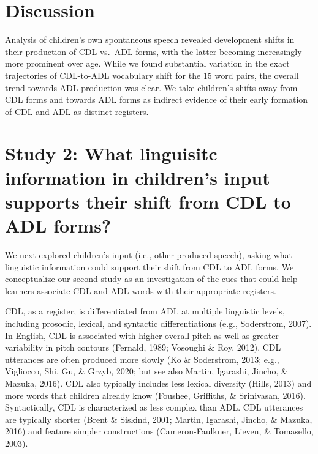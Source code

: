 \documentclass[10pt, letterpaper]{article}
\begin{document}
\hypertarget{discussion}{%
\section{Discussion}\label{discussion}}

Analysis of children's own spontaneous speech revealed development
shifts in their production of CDL vs.~ADL forms, with the latter
becoming increasingly more prominent over age. While we found
substantial variation in the exact trajectories of CDL-to-ADL vocabulary
shift for the 15 word pairs, the overall trend towards ADL production
was clear. We take children's shifts away from CDL forms and towards ADL
forms as indirect evidence of their early formation of CDL and ADL as
distinct registers.

\hypertarget{study-2-what-linguisitc-information-in-childrens-input-supports-their-shift-from-cdl-to-adl-forms}{%
\section{Study 2: What linguisitc information in children's input
supports their shift from CDL to ADL
forms?}\label{study-2-what-linguisitc-information-in-childrens-input-supports-their-shift-from-cdl-to-adl-forms}}

We next explored children's input (i.e., other-produced speech), asking
what linguistic information could support their shift from CDL to ADL
forms. We conceptualize our second study as an investigation of the cues
that could help learners associate CDL and ADL words with their
appropriate registers.

CDL, as a register, is differentiated from ADL at multiple linguistic
levels, including prosodic, lexical, and syntactic differentiations
(e.g., Soderstrom, 2007). In English, CDL is associated with higher
overall pitch as well as greater variability in pitch contours (Fernald,
1989; Vosoughi \& Roy, 2012). CDL utterances are often produced more
slowly (Ko \& Soderstrom, 2013; e.g., Vigliocco, Shi, Gu, \& Grzyb,
2020; but see also Martin, Igarashi, Jincho, \& Mazuka, 2016). CDL also
typically includes less lexical diversity (Hills, 2013) and more words
that children already know (Foushee, Griffiths, \& Srinivasan, 2016).
Syntactically, CDL is characterized as less complex than ADL. CDL
utterances are typically shorter (Brent \& Siskind, 2001; Martin,
Igarashi, Jincho, \& Mazuka, 2016) and feature simpler constructions
(Cameron-Faulkner, Lieven, \& Tomasello, 2003).
\end{document}
